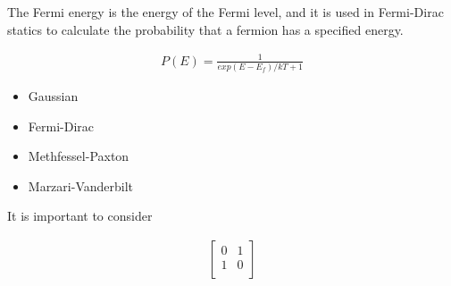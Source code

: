 The Fermi energy is the energy of the Fermi level, and it is used in Fermi-Dirac statics to calculate the probability that a fermion has a specified energy.

\begin{equation}
\begin{split}
P(E) = \frac{1}{exp(E - E_f) / k T + 1}
\end{split}
\label{eq:Fermi-Dirac distribution}
\end{equation}



\begin{itemize}
\item Gaussian
\item Fermi-Dirac
\item Methfessel-Paxton
\item Marzari-Vanderbilt
\end{itemize}











It is important to consider 



\begin{equation}
\begin{split}
\begin{bmatrix}
0 & 1  \\ 
1 & 0 \\ 
\end{bmatrix}
\end{split}
\label{eq:splineFitting}
\end{equation}



